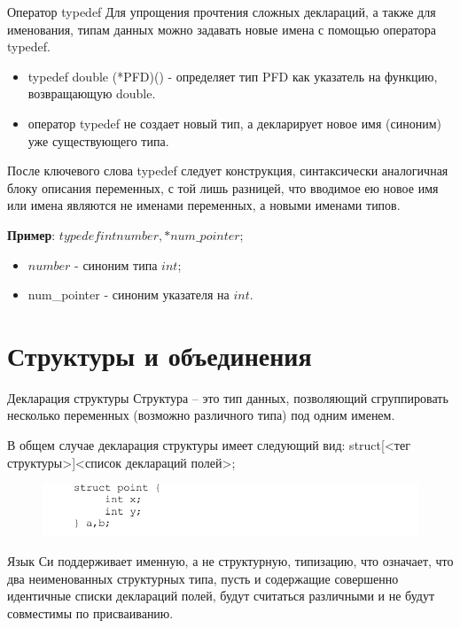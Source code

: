 \documentclass{beamer}
\begin{document}
\begin{frame}{Оператор typedef}
Для упрощения прочтения сложных деклараций, а также для именования, типам данных можно задавать новые имена с помощью оператора typedef. 
\begin{itemize}
\item typedef double (*PFD)() - определяет тип PFD как указатель на функцию, возвращающую double.
\item оператор typedef не создает новый тип, а декларирует новое имя (синоним) уже существующего типа.
\end{itemize}
После ключевого слова typedef следует конструкция, синтаксически аналогичная блоку описания переменных, с той лишь разницей, что вводимое ею новое имя или имена являются не именами переменных, а новыми именами типов.

\textbf{Пример}: $typedef int number, * num\_pointer$;

\begin{itemize}
\item $number$ - синоним типа $int$;
\item num\_pointer - синоним указателя на $int$.
\end{itemize}
\end{frame}

\section{Структуры и объединения}

\begin{frame}{Декларация структуры}
Структура – это тип данных, позволяющий сгруппировать несколько переменных (возможно различного типа) под одним именем. 

В общем случае декларация структуры имеет следующий вид:
struct[<тег структуры>]{<список деклараций полей>};
\begin{figure}[h]
\centering
\includegraphics[scale=0.5]{images/lec04-pic06.png}
\end{figure}
Язык Си поддерживает именную, а не структурную, типизацию, что означает, что два неименованных структурных типа, пусть и содержащие совершенно идентичные списки деклараций полей, будут считаться различными и не будут совместимы по присваиванию.
\end{frame}
\end{document}

